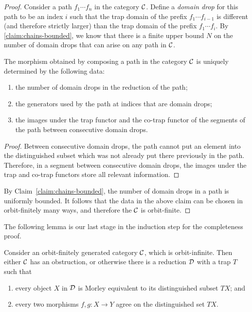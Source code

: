 \begin{proof}
        Consider a path $f_1  \cdots f_n$ in the category ${\mathcal C}$. Define a \emph{domain drop} for this path to be an index $i$ such that the trap domain of the prefix $f_1 \cdots f_{i-1}$ is different (and therefore strictly larger) than the trap domain of the prefix $f_1 \cdots f_i$. By \cref{claim:chains-bounded}, we know that there is a finite upper bound $N$ on the number of domain drops that can arise on any path in ${\mathcal C}$.

       \begin{claim}
                The morphism obtained by composing a path in the category ${\mathcal C}$ is uniquely determined by the following data:
     \begin{enumerate}
        \item the number  of domain drops in the reduction of the path;
        \item the generators used by the path at indices that are domain drops;
        \item the images under the trap functor and the co-trap functor  of the  segments of the path  between consecutive domain drops.
     \end{enumerate}
        \end{claim}
        \begin{proof}
            Between consecutive domain drops, the path cannot put an element into the distinguished subset which was not already put there previously in the path. Therefore, in a segment between consecutive domain drops, the images under the trap and co-trap functors store  all relevant information. 
        \end{proof}


    By Claim~\ref{claim:chains-bounded}, the number of domain drops in a path is uniformly bounded. It follows that the data in the above claim can be chosen in orbit-finitely many ways, and therefore the ${\mathcal C}$ is orbit-finite.
\end{proof}

The following lemma is our last stage in the induction step for the completeness proof. 
\begin{lemma}\label{lem:trap-reduction}
    Consider an orbit-finitely generated category ${\mathcal C}$, which is orbit-infinite. Then either ${\mathcal C}$ has an obstruction, or otherwise there is a reduction ${\mathcal D}$ with a trap $T$ such that 
    \begin{enumerate}
            \item\label{item:trap-reduction-morley-large} every object $X$ in ${\mathcal D}$ is  Morley equivalent to its distinguished subset $TX$; and 
            \item\label{item:trap-reduction-morphisms-agree}
             every two morphisms $f,g : X \to Y$ agree on the distinguished set $TX$.
        \end{enumerate}
\end{lemma}

